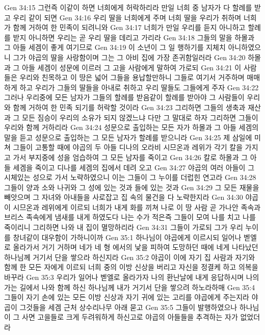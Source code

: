 Gen 34:15  그런즉 이같이 하면 너희에게 허락하리라 만일 너희 중 남자가 다 할례를 받고 우리 같이 되면
Gen 34:16  우리 딸을 너희에게 주며 너희 딸을 우리가 취하며 너희가 함께 거하여 한 민족이 되려니와
Gen 34:17  너희가 만일 우리를 듣지 아니하고 할례를 받지 아니하면 우리는 곧 우리 딸을 데리고 가리라
Gen 34:18  그들의 말을 하몰과 그 아들 세겜이 좋게 여기므로
Gen 34:19  이 소년이 그 일 행하기를 지체치 아니하였으니 그가 야곱의 딸을 사랑함이며 그는 그 아비 집에 가장 존귀함일러라
Gen 34:20  하몰과 그 아들 세겜이 성문에 이르러 그 고을 사람에게 말하여 가로되
Gen 34:21  이 사람들은 우리와 친목하고 이 땅은 넓어 그들을 용납할만하니 그들로 여기서 거주하며 매매하게 하고 우리가 그들의 딸들을 아내로 취하고 우리 딸들도 그들에게 주자
Gen 34:22  그러나 우리중에 모든 남자가 그들의 할례를 받음같이 할례를 받아야 그 사람들이 우리와 함께 거하여 한 민족 되기를 허락할 것이라
Gen 34:23  그리하면 그들의 생축과 재산과 그 모든 짐승이 우리의 소유가 되지 않겠느냐 다만 그 말대로 하자 그리하면 그들이 우리와 함께 거하리라
Gen 34:24  성문으로 출입하는 모든 자가 하몰과 그 아들 세겜의 말을 듣고 성문으로 출입하는 그 모든 남자가 할례를 받으니라
Gen 34:25  제 삼일에 미쳐 그들이 고통할 때에 야곱의 두 아들 디나의 오라비 시므온과 레위가 각기 칼을 가지고 가서 부지중에 성을 엄습하여 그 모든 남자를 죽이고
Gen 34:26  칼로 하몰과 그 아들 세겜을 죽이고 디나를 세겜의 집에서 데려 오고
Gen 34:27  야곱의 여러 아들이 그 시체있는 성으로 가서 노략하였으니 이는 그들이 그 누이를 더럽힌 연고라
Gen 34:28  그들이 양과 소와 나귀와 그 성에 있는 것과 들에 있는 것과
Gen 34:29  그 모든 재물을 빼앗으며 그 자녀와 아내들을 사로잡고 집 속의 물건을 다 노략한지라
Gen 34:30  야곱이 시므온과 레위에게 이르되 너희가 내게 화를 끼쳐 나로 이 땅 사람 곧 가나안 족속과 브리스 족속에게 냄새를 내게 하였도다 나는 수가 적은즉 그들이 모여 나를 치고 나를 죽이리니 그리하면 나와 내 집이 멸망하리라
Gen 34:31  그들이 가로되 그가 우리 누이를 창녀같이 대우함이 가하니이까
Gen 35:1  하나님이 야곱에게 이르시되 일어나 벧엘로 올라가서 거기 거하며 네가 네 형 에서의 낯을 피하여 도망하던 때에 네게 나타났던 하나님께 거기서 단을 쌓으라 하신지라
Gen 35:2  야곱이 이에 자기 집 사람과 자기와 함께 한 모든 자에게 이르되 너희 중의 이방 신상을 버리고 자신을 정결케 하고 의복을 바꾸라
Gen 35:3  우리가 일어나 벧엘로 올라가자 나의 환난날에 내게 응답하시며 나의 가는 길에서 나와 함께 하신 하나님께 내가 거기서 단을 쌓으려 하노라하매
Gen 35:4  그들이 자기 손에 있는 모든 이방 신상과 자기 귀에 있는 고리를 야곱에게 주는지라 야곱이 그것들을 세겜 근처 상수리나무 아래 묻고
Gen 35:5  그들이 발행하였으나 하나님이 그 사면 고을들로 크게 두려워하게 하신고로 야곱의 아들들을 추격하는 자가 없었더라
